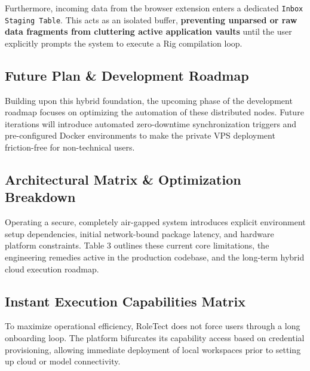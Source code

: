 \documentclass[10pt,a4paper]{article}
\begin{document}
Furthermore, incoming data from the browser extension enters a dedicated \texttt{Inbox Staging Table}. This acts as an isolated buffer, \textbf{preventing unparsed or raw data fragments from cluttering active application vaults} until the user explicitly prompts the system to execute a Rig compilation loop.

\subsection{Future Plan \& Development Roadmap}
Building upon this hybrid foundation, the upcoming phase of the development roadmap focuses on optimizing the automation of these distributed nodes. Future iterations will introduce automated zero-downtime synchronization triggers and pre-configured Docker environments to make the private VPS deployment friction-free for non-technical users.

\subsection{Architectural Matrix \& Optimization Breakdown}
Operating a secure, completely air-gapped system introduces explicit environment setup dependencies, initial network-bound package latency, and hardware platform constraints. Table 3 outlines these current core limitations, the engineering remedies active in the production codebase, and the long-term hybrid cloud execution roadmap.




\subsection{Instant Execution Capabilities Matrix}
To maximize operational efficiency, RoleTect does not force users through a long onboarding loop. The platform bifurcates its capability access based on credential provisioning, allowing immediate deployment of local workspaces prior to setting up cloud or model connectivity.
\end{document}

